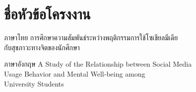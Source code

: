 \section{ชื่อหัวข้อโครงงาน}

\noindent
ภาษาไทย \hspace{0.5em} การศึกษาความสัมพันธ์ระหว่างพฤติกรรมการใช้โซเชียลมีเดีย\\
\hspace*{4.2em} กับสุขภาวะทางจิตของนักศึกษา

\vspace{0.5em}

\noindent
ภาษาอังกฤษ \hspace{0.5em} A Study of the Relationship between Social Media\\
\hspace*{5.6em} Usage Behavior and Mental Well-being among\\
\hspace*{5.6em} University Students

